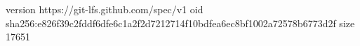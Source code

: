 version https://git-lfs.github.com/spec/v1
oid sha256:e826f39c2fddf6dfe6c1a2f2d7212714f10bdfea6ec8bf1002a72578b6773d2f
size 17651
